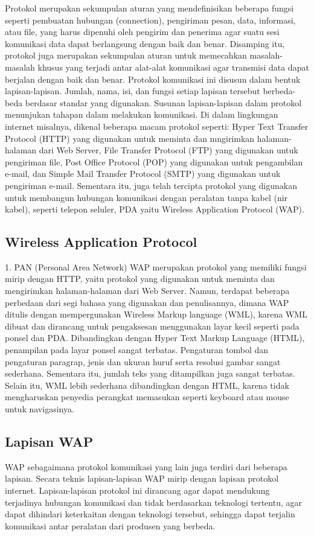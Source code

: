 \documentclass{jtetiproposalskripsi}
\begin{document}
Protokol merupakan sekumpulan aturan yang mendefinisikan beberapa fungsi seperti pembuatan hubungan (connection), pengiriman pesan, data, informasi, atau file, yang harus dipenuhi oleh pengirim dan penerima agar suatu sesi komunikasi data dapat berlangsung dengan baik dan benar. Disamping itu, protokol juga merupakan sekumpulan aturan untuk memecahkan masalah-masalah khusus yang terjadi antar alat-alat komunikasi agar transmisi data dapat berjalan dengan baik dan benar.
Protokol komunikasi ini disusun dalam bentuk lapisan-lapisan. Jumlah, nama, isi, dan fungsi setiap lapisan tersebut berbeda-beda berdasar standar yang digunakan. Susunan lapisan-lapisan dalam protokol menunjukan tahapan dalam melakukan komunikasi.
Di dalam lingkungan internet misalnya, dikenal beberapa macam protokol seperti: Hyper Text Transfer Protocol (HTTP) yang digunakan untuk meminta dan mngirimkan halaman-halaman dari Web Server, File Transfer Protocol (FTP) yang digunakan untuk pengiriman file, Post Office Protocol (POP) yang digunakan untuk pengambilan e-mail, dan Simple Mail Transfer Protocol (SMTP) yang digunakan untuk pengiriman e-mail.
Sementara itu, juga telah tercipta protokol yang digunakan untuk membangun hubungan komunikasi dengan peralatan tanpa kabel (nir kabel), seperti telepon seluler, PDA yaitu Wireless Application Protocol (WAP).

\subsection{Wireless Application Protocol}
1. PAN (Personal Area Network)
WAP merupakan protokol yang memiliki fungsi mirip dengan HTTP, yaitu protokol yang digunakan untuk meminta dan mengirimkan halaman-halaman dari Web Server. Namun, terdapat beberapa perbedaan dari segi bahasa yang digunakan dan penulisannya, dimana WAP ditulis dengan mempergunakan Wireless Markup language (WML), karena WML dibuat dan dirancang untuk pengaksesan menggunakan layar kecil seperti pada ponsel dan PDA.
Dibandingkan dengan Hyper Text Markup Language (HTML), penampilan pada layar ponsel sangat terbatas. Pengaturan tombol dan pengaturan paragrap, jenis dan ukuran huruf serta resolusi gambar  sangat sederhana. Sementara itu, jumlah teks yang ditampilkan juga sangat terbatas.
Selain itu, WML lebih sederhana dibandingkan dengan HTML, karena tidak mengharuskan penyedia perangkat  memasukan seperti keyboard atau mouse untuk navigasinya.

\subsection{Lapisan WAP}
WAP sebagaimana protokol komunikasi yang lain juga terdiri dari beberapa lapisan. Secara teknis lapisan-lapisan WAP mirip dengan lapisan protokol internet. Lapisan-lapisan protokol ini dirancang agar dapat mendukung terjadinya hubungan komunikasi dan tidak berdasarkan teknologi tertentu, agar dapat dihindari keterkaitan dengan teknologi tersebut, sehingga dapat terjalin komunikasi antar peralatan dari produsen yang berbeda.
\end{document}
